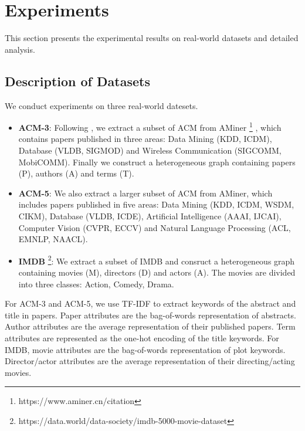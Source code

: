 \section{Experiments}\label{section-5}
This section presents the experimental results on real-world datasets and detailed analysis.

\subsection{Description of Datasets}
We conduct experiments on three real-world datesets.
\begin{itemize}
	\item \textbf{ACM-3}:
    Following \citet{DBLP:conf/www/WangJSWYCY19}, we extract a subset of ACM from AMiner \footnote{https://www.aminer.cn/citation} \cite{DBLP:conf/kdd/TangZYLZS08}, which contains papers published in three areas: Data Mining (KDD, ICDM), Database (VLDB, SIGMOD) and Wireless Communication (SIGCOMM, MobiCOMM). Finally we construct a heterogeneous graph containing papers (P), authors (A) and terms (T). 
    
    \item \textbf{ACM-5}: 
    We also extract a larger subset of ACM from AMiner, which includes papers published in five areas: Data Mining (KDD, ICDM, WSDM, CIKM), Database (VLDB, ICDE), Artificial Intelligence (AAAI, IJCAI), Computer Vision (CVPR, ECCV) and Natural Language Processing (ACL, EMNLP, NAACL).
    
    \item \textbf{IMDB} \footnote{https://data.world/data-society/imdb-5000-movie-dataset}:
    We extract a subset of IMDB and consruct a heterogeneous graph containing movies (M), directors (D) and actors (A). The movies are divided into three classes: Action, Comedy, Drama.
\end{itemize}

For ACM-3 and ACM-5, we use TF-IDF \cite{ramos2003using} 
to extract keywords of the abstract and title in papers. Paper attributes are the bag-of-words representation of abstracts. Author attributes are the average representation of their published papers. Term attributes are represented as the one-hot encoding of the title keywords. For IMDB, movie attributes are the bag-of-words representation of plot keywords. Director/actor attributes are the average representation of their directing/acting movies.

